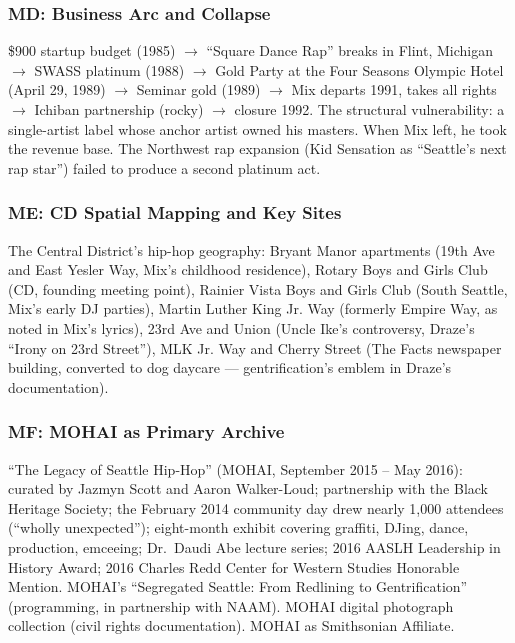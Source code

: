 \documentclass[11pt,letterpaper]{article}
\begin{document}
\subsubsection{MD: Business Arc and Collapse}

\$900 startup budget (1985) $\rightarrow$ ``Square Dance Rap'' breaks in Flint, Michigan $\rightarrow$
SWASS platinum (1988) $\rightarrow$ Gold Party at the Four Seasons Olympic Hotel (April 29, 1989)
$\rightarrow$ Seminar gold (1989) $\rightarrow$ Mix departs 1991, takes all rights $\rightarrow$
Ichiban partnership (rocky) $\rightarrow$ closure 1992. The structural vulnerability: a single-artist
label whose anchor artist owned his masters. When Mix left, he took the revenue base. The Northwest
rap expansion (Kid Sensation as ``Seattle's next rap star'') failed to produce a second platinum act.

\subsubsection{ME: CD Spatial Mapping and Key Sites}

The Central District's hip-hop geography: Bryant Manor apartments (19th Ave and East Yesler Way,
Mix's childhood residence), Rotary Boys and Girls Club (CD, founding meeting point), Rainier Vista
Boys and Girls Club (South Seattle, Mix's early DJ parties), Martin Luther King Jr. Way (formerly
Empire Way, as noted in Mix's lyrics), 23rd Ave and Union (Uncle Ike's controversy, Draze's
``Irony on 23rd Street''), MLK Jr. Way and Cherry Street (The Facts newspaper building, converted
to dog daycare --- gentrification's emblem in Draze's documentation).

\subsubsection{MF: MOHAI as Primary Archive}

``The Legacy of Seattle Hip-Hop'' (MOHAI, September 2015 -- May 2016): curated by Jazmyn Scott
and Aaron Walker-Loud; partnership with the Black Heritage Society; the February 2014 community
day drew nearly 1,000 attendees (``wholly unexpected''); eight-month exhibit covering graffiti,
DJing, dance, production, emceeing; Dr.\ Daudi Abe lecture series; 2016 AASLH Leadership in
History Award; 2016 Charles Redd Center for Western Studies Honorable Mention. MOHAI's
``Segregated Seattle: From Redlining to Gentrification'' (programming, in partnership with NAAM).
MOHAI digital photograph collection (civil rights documentation). MOHAI as Smithsonian Affiliate.
\end{document}
